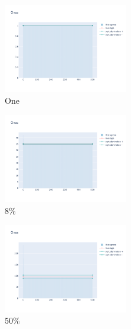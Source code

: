 \documentclass[12pt, fleqn]{report}                             %
\theoremstyle{break}                                            %
\begin{document}
      \begin{figure}[ht!]
        \centering
        \begin{subfigure}[b]{0.4\linewidth}
          \includegraphics[width=0.6\textwidth]{Images/152/dia-a.png}
          \caption{One}
        \end{subfigure}
        \begin{subfigure}[b]{0.4\linewidth}
          \includegraphics[width=0.6\textwidth]{Images/152/dia-b.png}
          \caption{8\%}
        \end{subfigure}
        \begin{subfigure}[b]{0.4\linewidth}
          \includegraphics[width=0.6\textwidth]{Images/152/dia-c.png}
          \caption{50\%}
        \end{subfigure}
        \begin{subfigure}[b]{0.4\linewidth}

\end{subfigure}
\end{figure}
\end{document}
